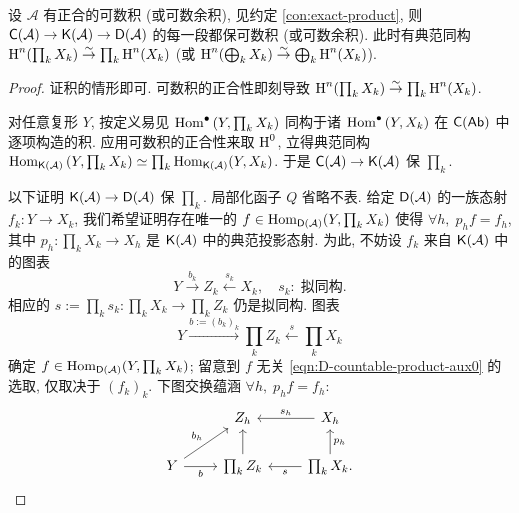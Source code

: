 \begin{lemma}\label{prop:D-countable-product}
	设 $\mathcal{A}$ 有正合的可数积 (或可数余积), 见约定 \ref{con:exact-product}, 则 $\mathsf{C}(\mathcal{A}) \to \mathsf{K}(\mathcal{A}) \to \mathsf{D}(\mathcal{A})$ 的每一段都保可数积 (或可数余积). 此时有典范同构 $\operatorname{H}^n(\prod_k X_k) \stackrel{\sim}{\rightarrow} \prod_k \operatorname{H}^n(X_k)$ (或 $\operatorname{H}^n(\bigoplus_k X_k) \stackrel{\sim}{\rightarrow} \bigoplus_k \operatorname{H}^n(X_k)$).
\end{lemma}
\begin{proof}
	证积的情形即可. 可数积的正合性即刻导致 $\operatorname{H}^n(\prod_k X_k) \stackrel{\sim}{\rightarrow} \prod_k \operatorname{H}^n(X_k)$.

	对任意复形 $Y$, 按定义易见 $\operatorname{Hom}^\bullet\left( Y, \prod_k X_k \right)$ 同构于诸 $\operatorname{Hom}^\bullet\left( Y, X_k \right)$ 在 $\mathsf{C}(\mathsf{Ab})$ 中逐项构造的积. 应用可数积的正合性来取 $\operatorname{H}^0$, 立得典范同构 $\operatorname{Hom}_{\mathsf{K}(\mathcal{A})}\left( Y, \prod_k X_k \right) \simeq \prod_k \operatorname{Hom}_{\mathsf{K}(\mathcal{A})}(Y, X_k)$. 于是 $\mathsf{C}(\mathcal{A}) \to \mathsf{K}(\mathcal{A})$ 保 $\prod_k$.

	以下证明 $\mathsf{K}(\mathcal{A}) \to \mathsf{D}(\mathcal{A})$ 保 $\prod_k$. 局部化函子 $Q$ 省略不表. 给定 $\mathsf{D}(\mathcal{A})$ 的一族态射 $f_k: Y \to X_k$, 我们希望证明存在唯一的 $f \in \operatorname{Hom}_{\mathsf{D}(\mathcal{A})}(Y, \prod_k X_k)$ 使得 $\forall h, \; p_h f = f_h$, 其中 $p_h: \prod_k X_k \to X_h$ 是 $\mathsf{K}(\mathcal{A})$ 中的典范投影态射. 为此, 不妨设 $f_k$ 来自 $\mathsf{K}(\mathcal{A})$ 中的图表
	\begin{equation}\label{eqn:D-countable-product-aux0}
		Y \xrightarrow{b_k}  Z_k \xleftarrow{s_k} X_k, \quad s_k:\; \text{拟同构}.
	\end{equation}
	相应的 $s := \prod_k s_k : \prod_k X_k \to \prod_k Z_k$ 仍是拟同构. 图表
	\[ Y \xrightarrow{b := (b_k)_k} \prod_k Z_k \xleftarrow{s} \prod_k X_k \]
	确定 $f \in \operatorname{Hom}_{\mathsf{D}(\mathcal{A})}(Y, \prod_k X_k)$; 留意到 $f$ 无关 \eqref{eqn:D-countable-product-aux0} 的选取, 仅取决于 $(f_k)_k$. 下图交换蕴涵 $\forall h, \; p_h f = f_h$:
	\[\begin{tikzcd}
		& Z_h & X_h \arrow[l, "s_h"'] \\
		Y \arrow[r, "b"'] \arrow[ru, "b_h"] & \prod_k Z_k \arrow[u] & \prod_k X_k \arrow[l, "s"] \arrow[u, "p_h"'] .
	\end{tikzcd} \]


\end{proof}
